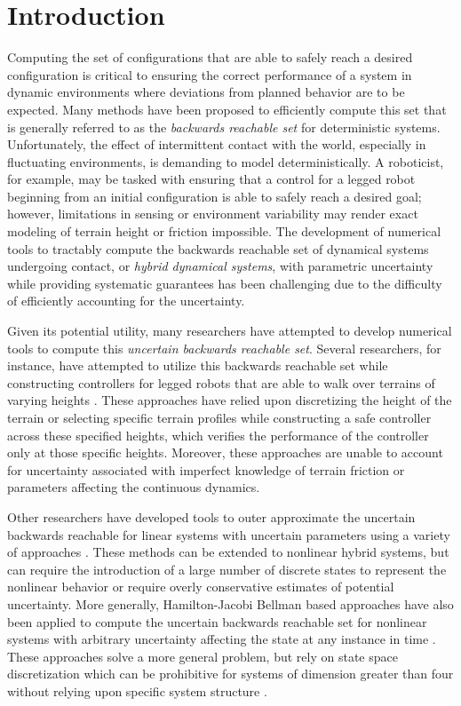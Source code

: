 \section{Introduction}
  
Computing the set of configurations that are able to safely reach a desired configuration is critical to ensuring the correct performance of a system in dynamic environments where deviations from planned behavior are to be expected.
Many methods have been proposed to efficiently compute this set that is generally referred to as the \emph{backwards reachable set} for deterministic systems.
Unfortunately, the effect of intermittent contact with the world, especially in fluctuating environments, is demanding to model deterministically. 
A roboticist, for example, may be tasked with ensuring that a control for a legged robot beginning from an initial configuration is able to safely reach a desired goal; however, limitations in sensing or environment variability may render exact modeling of terrain height or friction impossible.
The development of numerical tools to tractably compute the backwards reachable set of dynamical systems undergoing contact, or \emph{hybrid dynamical systems}, with parametric uncertainty while providing systematic guarantees has been challenging due to the difficulty of efficiently accounting for the uncertainty.   

Given its potential utility, many researchers have attempted to develop numerical tools to compute this \emph{uncertain backwards reachable set}.
Several researchers, for instance, have attempted to utilize this backwards reachable set while constructing controllers for legged robots that are able to walk over terrains of varying heights \cite{byl2008metastable,dai2012optimizing,griffin2015,saglam2013switching}. 
These approaches have relied upon discretizing the height of the terrain or selecting specific terrain profiles while constructing a safe controller across these specified heights, which verifies the performance of the controller only at those specific heights.
Moreover, these approaches are unable to account for uncertainty associated with imperfect knowledge of terrain friction or parameters affecting the continuous dynamics.

Other researchers have developed tools to outer approximate the uncertain backwards reachable for linear systems with uncertain parameters using a variety of approaches \cite{girard2005reachability,althoff2008reachability}. 
These methods can be extended to nonlinear hybrid systems, but can require the introduction of a large number of discrete states to represent the nonlinear behavior or require overly conservative estimates of potential uncertainty. 
More generally, Hamilton-Jacobi Bellman based approaches have also been applied to compute the uncertain backwards reachable set for nonlinear systems with arbitrary uncertainty affecting the state at any instance in time \cite{tomlin2003computational}. 
These approaches solve a more general problem, but rely on state space discretization which can be prohibitive for systems of dimension greater than four without relying upon specific system structure \cite{maidens2013lagrangian}.

